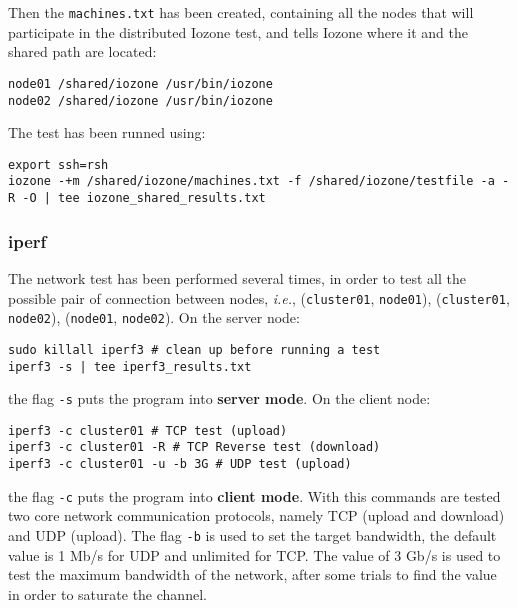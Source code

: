 Then the \texttt{machines.txt} has been created, containing all the nodes that will participate in the distributed Iozone test, and tells Iozone where it and the shared path are located:

\begin{verbatim}
node01 /shared/iozone /usr/bin/iozone 
node02 /shared/iozone /usr/bin/iozone
\end{verbatim}

The test has been runned using:

\begin{verbatim}
export ssh=rsh
iozone -+m /shared/iozone/machines.txt -f /shared/iozone/testfile -a -R -O | tee iozone_shared_results.txt
\end{verbatim}

\subsubsection{iperf}

The network test has been performed several times, in order to test all the possible pair of connection between nodes, \textit{i.e.}, (\texttt{cluster01}, \texttt{node01}), (\texttt{cluster01}, \texttt{node02}), (\texttt{node01}, \texttt{node02}).
On the server node:

\begin{verbatim}
sudo killall iperf3 # clean up before running a test
iperf3 -s | tee iperf3_results.txt
\end{verbatim}
the flag \texttt{-s} puts the program into \textbf{server mode}. On the client node:

\begin{verbatim}
iperf3 -c cluster01 # TCP test (upload)
iperf3 -c cluster01 -R # TCP Reverse test (download)
iperf3 -c cluster01 -u -b 3G # UDP test (upload)
\end{verbatim}

the flag \texttt{-c} puts the program into \textbf{client mode}. With this commands are tested two core network communication protocols, namely TCP (upload and download) and UDP (upload). The flag \texttt{-b} is used to set the target bandwidth, the default value is 1 Mb/s for UDP and unlimited for TCP. The value of 3 Gb/s is used to test the maximum bandwidth of the network, after some trials to find the value in order to saturate the channel.
